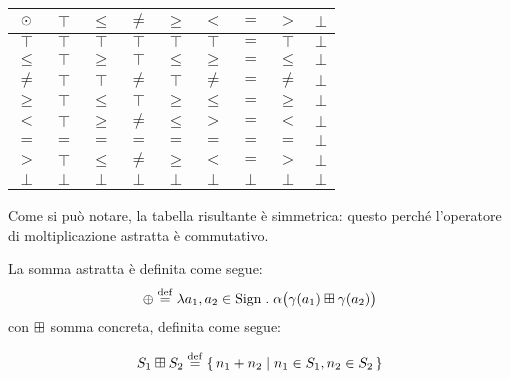 \begin{center}
        \begin{tabular}{ c | c c c c c c c c }
                $\mathbin{\odot}$ & $\top$ & $\leq$ & $\neq$ & $\geq$ & $<$ & $=$ & $>$ & $\bot$ \\
                \hline
                $\top$ & $\top$ & $\top$ & $\top$ & $\top$ & $\top$ & $=$ & $\top$ & $\bot$  \\
                $\leq$ & $\top$ & $\geq$ & $\top$ & $\leq$ & $\geq$ & $=$ & $\leq$ & $\bot$\\
                $\neq$ & $\top$ & $\top$ & $\neq$ & $\top$ & $\neq$ & $=$ & $\neq$ & $\bot$ \\
                $\geq$ & $\top$ & $\leq$ & $\top$ & $\geq$ & $\leq$ & $=$ & $\geq$ & $\bot$ \\
                $<$ & $\top$ & $\geq$ & $\neq$ & $\leq$ & $>$ & $=$ & $<$ & $\bot$ \\
                $=$ & $=$ & $=$ & $=$ & $=$ & $=$ & $=$ & $=$ & $\bot$\\
                $>$ & $\top$ & $\leq$ & $\neq$ & $\geq$ & $<$ & $=$ & $>$ & $\bot$\\
                $\bot$ & $\bot$ & $\bot$ & $\bot$ & $\bot$ & $\bot$ & $\bot$ & $\bot$ & $\bot$ \\
        \end{tabular}
\end{center}

Come si può notare, la tabella risultante è simmetrica:
questo perché l'operatore di moltiplicazione astratta è commutativo.

\begin{definizione}
La somma astratta è definita come segue:
\[
        \absadd \defeq \lambda a_1,a_2 \in \Sign \st \alpha\bigl(\gamma(a_1) \conadd \gamma(a_2)\bigr)
\]
con $\mathbin{\boxplus}$ somma concreta, definita come segue:

\[
        S_1 \conadd S_2 \defeq \{\, n_1 + n_2 \mid n_1 \in S_1, n_2 \in S_2 \,\}
\]
\end{definizione}

